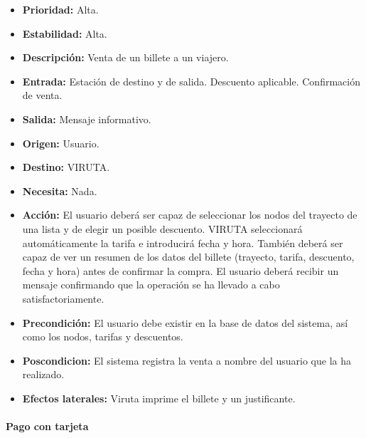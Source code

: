 \begin{itemize}
\item \textbf{Prioridad:} Alta.
\item \textbf{Estabilidad:} Alta.
\item \textbf{Descripción:} Venta de un billete a un viajero.
\item \textbf{Entrada:} Estación de destino y de salida. Descuento aplicable. Confirmación de venta.
\item \textbf{Salida:} Mensaje informativo.
\item \textbf{Origen:} Usuario.
\item \textbf{Destino:} VIRUTA.
\item \textbf{Necesita:} Nada.
\item \textbf{Acción:} El usuario deberá ser capaz de seleccionar los nodos del trayecto de una lista y de elegir un posible descuento. VIRUTA seleccionará automáticamente la tarifa e introducirá fecha y hora. También deberá ser capaz de ver un resumen de los datos del billete (trayecto, tarifa, descuento, fecha y hora) antes de confirmar la compra. El usuario deberá recibir un mensaje confirmando que la operación se ha llevado a cabo satisfactoriamente.
\item \textbf{Precondición:} El usuario debe existir en la base de datos del sistema, así como los nodos, tarifas y descuentos.
\item \textbf{Poscondicion:} El sistema registra la venta a nombre del usuario que la ha realizado.
\item \textbf{Efectos laterales:} Viruta imprime el billete y un justificante.
\end{itemize}

\paragraph{Pago con tarjeta}

